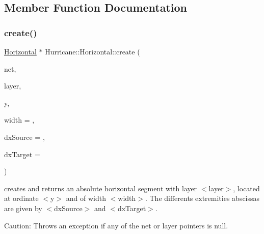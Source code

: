 \subsection{Member Function Documentation}
\mbox{\label{classHurricane_1_1Horizontal_a15f13508993b6c0219fb944fe1141c3f}} 
\subsubsection{\texorpdfstring{create()}{create()}\hspace{0.1cm}{\footnotesize\ttfamily [1/2]}}
{\footnotesize\ttfamily \mbox{\hyperlink{classHurricane_1_1Horizontal}{Horizontal}} $\ast$ Hurricane\+::\+Horizontal\+::create (\begin{DoxyParamCaption}\item[{\mbox{\hyperlink{classHurricane_1_1Net}{Net}} $\ast$}]{net,  }\item[{const \mbox{\hyperlink{classHurricane_1_1Layer}{Layer}} $\ast$}]{layer,  }\item[{const \mbox{\hyperlink{group__DbUGroup_ga4fbfa3e8c89347af76c9628ea06c4146}{Db\+U\+::\+Unit}} \&}]{y,  }\item[{const \mbox{\hyperlink{group__DbUGroup_ga4fbfa3e8c89347af76c9628ea06c4146}{Db\+U\+::\+Unit}} \&}]{width = {},  }\item[{const \mbox{\hyperlink{group__DbUGroup_ga4fbfa3e8c89347af76c9628ea06c4146}{Db\+U\+::\+Unit}} \&}]{dx\+Source = {},  }\item[{const \mbox{\hyperlink{group__DbUGroup_ga4fbfa3e8c89347af76c9628ea06c4146}{Db\+U\+::\+Unit}} \&}]{dx\+Target = {} }\end{DoxyParamCaption})\hspace{0.3cm}{\ttfamily [static]}}

creates and returns an absolute horizontal segment with layer {\ttfamily $<$layer$>$}, located at ordinate {\ttfamily $<$y$>$} and of width {\ttfamily $<$width$>$}. The differents extremities abscissas are given by {\ttfamily $<$dx\+Source$>$} and {\ttfamily $<$dx\+Target$>$}.

\begin{DoxyParagraph}{Caution\+: Throws an exception if any of the net or layer pointers is }
null. 
\end{DoxyParagraph}
\mbox{\label{classHurricane_1_1Horizontal_ac30e0cbdfdd1f2cb02f000380652daf7}} 
